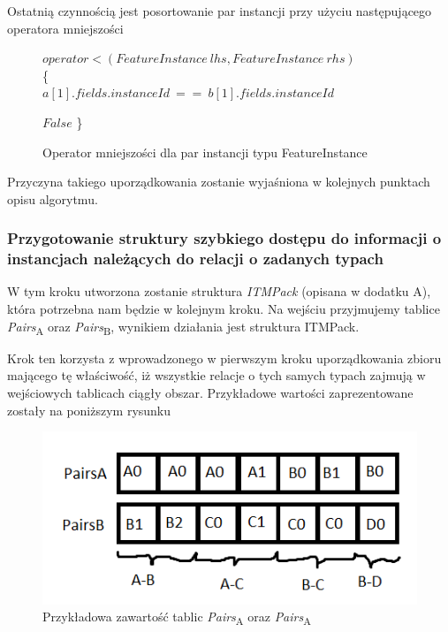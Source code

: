 \documentclass[12pt]{article}
\makeatletter
\newcounter{operator}
\newenvironment{operator}[1][htb]
  {
  \renewcommand*{\algorithmcfname}{Operator}%
  \let\c@algocf\c@operator
   \begin{algorithm}[#1]
  }
  {\end{algorithm}}
\newcounter{algorytm}
\makeatother
\begin{document}
Ostatnią czynnością jest posortowanie par instancji przy użyciu następującego operatora mniejszości

\begin{figure}[H]

\begin{operator}[H]
$operator<(FeatureInstance\ lhs,FeatureInstance\ rhs) $\\
\{\\
   {
       {
	  	 {
	  		\Return $ a[1].fields.instanceId\ ==\ b[1].fields.instanceId $ \;
	  	}	
	  }
  }
  
  \Return $ False $ \;
\}
  
\caption{Operator mniejszości dla par instancji typu FeatureInstance}
\end{operator}
\end{figure}


Przyczyna takiego uporządkowania zostanie wyjaśniona w kolejnych punktach opisu algorytmu.

\subsubsection{Przygotowanie struktury szybkiego dostępu do informacji o instancjach należących do relacji o zadanych typach }

W tym kroku utworzona zostanie struktura \textit{ITMPack} (opisana w dodatku A), która potrzebna nam będzie w kolejnym kroku. Na wejściu przyjmujemy tablice \textit{Pairs}\textsubscript{A} oraz \textit{Pairs}\textsubscript{B}, wynikiem działania jest struktura ITMPack.

Krok ten korzysta z wprowadzonego w pierwszym kroku uporządkowania zbioru mającego tę właściwość, iż wszystkie relacje o tych samych typach zajmują w wejściowych tablicach ciągły obszar. Przykładowe wartości zaprezentowane zostały na poniższym rysunku

\begin{figure}[H]
\centering
\includegraphics{sortAttr_insTable}
\caption{Przykładowa zawartość tablic \textit{Pairs}\textsubscript{A} oraz \textit{Pairs}\textsubscript{A}}
\end{figure}
\end{document}
